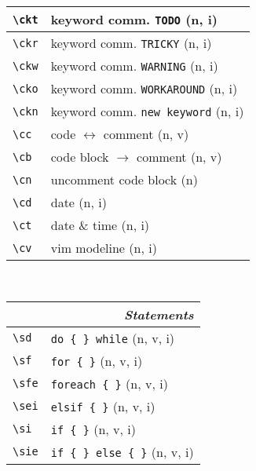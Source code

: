 \documentclass[oneside,10pt,landscape,DIV17]{scrartcl}
\begin{document}
\begin{multicols}{3}
\begin{center}
\begin{tabular}[]{|p{11mm}|p{58mm}|}
\hline \verb'\ckt' & keyword comm. \verb'TODO'         \hfill (n, i)   \\
\hline \verb'\ckr' & keyword comm. \verb'TRICKY'       \hfill (n, i)   \\
\hline \verb'\ckw' & keyword comm. \verb'WARNING'      \hfill (n, i)   \\
\hline \verb'\cko' & keyword comm. \verb'WORKAROUND'   \hfill (n, i)   \\
\hline \verb'\ckn' & keyword comm. \verb'new keyword'  \hfill (n, i)   \\
\hline \verb'\cc'  & code $\leftrightarrow$ comment    \hfill (n, v)   \\
\hline \verb'\cb'  & code block $\rightarrow$ comment  \hfill (n, v)   \\
\hline \verb'\cn'  & uncomment code block              \hfill (n)      \\
\hline \verb'\cd'  & date                              \hfill (n, i)   \\
\hline \verb'\ct'  & date \& time                      \hfill (n, i)   \\
\hline \verb'\cv'  & vim modeline                      \hfill (n, i)   \\
\hline
\end{tabular}\\
%
%
\begin{tabular}[]{|p{11mm}|p{58mm}|}
\hline
\multicolumn{2}{|r|}{\textsl{\textbf{S}tatements}}                     \\
\hline \verb'\sd'  & \verb'do { } while'               \hfill (n, v, i)\\
\hline \verb'\sf'  & \verb'for { }'                    \hfill (n, v, i)\\
\hline \verb'\sfe' & \verb'foreach { }'                \hfill (n, v, i)\\
\hline \verb'\sei' & \verb'elsif { }'                  \hfill (n, v, i)\\
\hline \verb'\si'  & \verb'if { }'                     \hfill (n, v, i)\\
\hline \verb'\sie' & \verb'if { } else { }'            \hfill (n, v, i)\\

\end{tabular}
\end{center}
\end{multicols}
\end{document}
